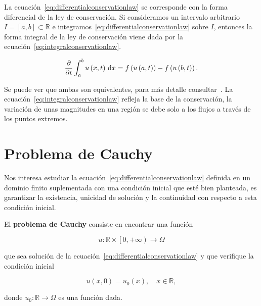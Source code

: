 \begin{remark}
  La ecuación~\eqref{eq:differentialconservationlaw} se corresponde
  con la forma diferencial de la ley de conservación.
  Si consideramos un intervalo arbitrario
  \begin{math}
    I=
    \left[a,b\right]\subset
    \mathbb{R}
  \end{math}
  e integramos~\eqref{eq:differentialconservationlaw} sobre $I$,
  entonces la forma integral de la ley de conservación viene dada por
  la ecuación~\eqref{eq:integralconservationlaw}.

  \begin{equation}\label{eq:integralconservationlaw}
    \diffp{}{t}
    \int_{a}^{b}
    u\left(x,t\right)\dl x=
    f\left(u\left(a,t\right)\right)-
    f\left(u\left(b,t\right)\right).
  \end{equation}

  Se puede ver que ambas son equivalentes, para más detalle
  consultar~\cite{Leveque2002}.
  La ecuación~\eqref{eq:integralconservationlaw} refleja la base de
  la conservación, la variación de unas magnitudes en una región se
  debe solo a los flujos a través de los puntos extremos.
\end{remark}

\section{Problema de Cauchy}

Nos interesa estudiar la
ecuación~\eqref{eq:differentialconservationlaw} definida en un
dominio finito suplementada con una condición inicial que esté bien
planteada, es garantizar la existencia, unicidad de solución y la
continuidad con respecto a esta condición inicial.

\begin{definition}
  El \textbf{problema de Cauchy} consiste en encontrar una función

  \begin{equation*}
    u\colon\mathbb{R}\times
    \left[0,+\infty\right)\longrightarrow
    \Omega
  \end{equation*}

  que sea solución de la
  ecuación~\eqref{eq:differentialconservationlaw} y que verifique la
  condición inicial

  \begin{equation}\label{eq:initialcondition}
    u\left(x,0\right)=
    u_{0}\left(x\right),\quad
    x\in\mathbb{R},
  \end{equation}

  donde
  \begin{math}
    u_{0}\colon\mathbb{R}\to\Omega
  \end{math}
  es una función dada.
\end{definition}

